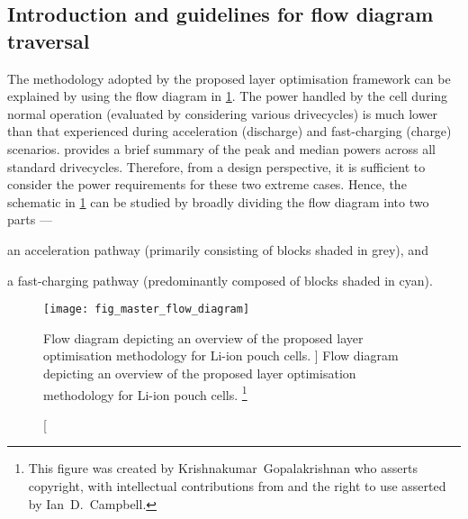 

\subsection{Introduction and guidelines for flow diagram traversal}

The  methodology adopted  by the  proposed layer  optimisation framework  can be
explained by  using the  flow diagram in  \cref{fig:fig_strategy_schematic}. The
power  handled by  the cell  during normal  operation (evaluated  by considering
various drivecycles)  is much  lower than  that experienced  during acceleration
(discharge)  and  fast-charging (charge)  scenarios.  
provides  a brief  summary of  the peak  and median  powers across  all standard
drivecycles. Therefore, from a design  perspective, it is sufficient to consider
the power  requirements for  these two  extreme cases.  Hence, the  schematic in
\cref{fig:fig_strategy_schematic} can  be studied  by broadly dividing  the flow
diagram into two parts ---
\begin{enumerate*}[label=\roman*)]
    \item an acceleration pathway (primarily consisting of blocks shaded in grey), and
    \item a fast-charging pathway (predominantly composed of blocks shaded in cyan).
\end{enumerate*}

\begin{figure}[p]
    \begin{minipage}[t]{\textwidth}
        \centering
        \texttt{[image: fig\_master\_flow\_diagram]}
        \captionsetup{labelsep=note}
        \caption
        [%
        Flow diagram depicting an overview of the proposed layer optimisation methodology
        for Li-ion pouch cells.
        ]%
        {%
            Flow diagram depicting an overview of the proposed layer optimisation methodology
            for Li-ion pouch cells.
        }%
        \label{fig:fig_strategy_schematic}
        \mpfootnotes[1]
        \vspace*{0.7225cm}
        \footnote{This figure was created by \mbox{Krishnakumar Gopalakrishnan} who
            asserts copyright, with intellectual contributions from and the right to
        use asserted by \mbox{Ian D.\ Campbell}.}
    \end{minipage}
\end{figure}

